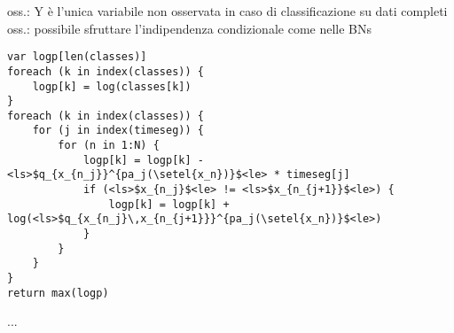 oss.: Y è l'unica variabile non osservata in caso di classificazione su
dati completi
oss.: possibile sfruttare l'indipendenza condizionale come nelle BNs


\begin{lstlisting}[caption=Inferenza su un classificatore \acs{CTBN},label=lst:ctbnc-inference]
var logp[len(classes)]
foreach (k in index(classes)) {
    logp[k] = log(classes[k])
}
foreach (k in index(classes)) {
    for (j in index(timeseg)) {
        for (n in 1:N) {
            logp[k] = logp[k] - <ls>$q_{x_{n_j}}^{pa_j(\setel{x_n})}$<le> * timeseg[j]
            if (<ls>$x_{n_j}$<le> != <ls>$x_{n_{j+1}}$<le>) {
                logp[k] = logp[k] + log(<ls>$q_{x_{n_j}\,x_{n_{j+1}}}^{pa_j(\setel{x_n})}$<le>)
            }
        }
    }
}
return max(logp)
\end{lstlisting}


...

